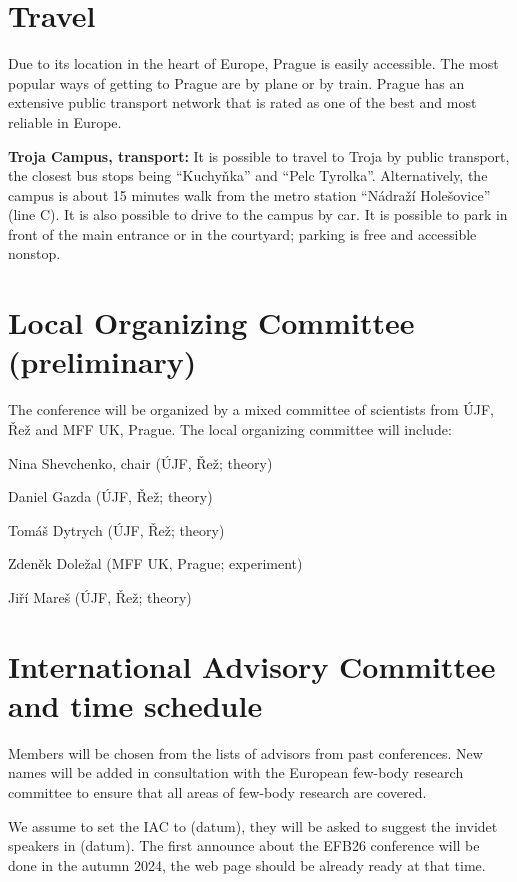 \documentclass[12pt]{extarticle}
\newcommand*\sq{\mathbin{\vcenter{\hbox{\rule{.8ex}{.8ex}}}}}
\newenvironment{t_sq_itemize}
{\begin{itemize}[topsep=0pt, parsep=0pt, itemsep=0pt, leftmargin=*]
    \renewcommand{\labelitemi}{{\(\sq\)}}}
  {\end{itemize}}
\begin{document}
\section*{Travel}
\noindent
%
Due to its location in the heart of Europe, Prague is easily
accessible. The most popular ways of getting to Prague are by plane or
by train. Prague has an extensive public transport network that is
rated as one of the best and most reliable in Europe.

{\bf Troja Campus, transport:} It is possible to travel to Troja by public transport, the closest bus stops being “Kuchyňka”
and “Pelc Tyrolka”. Alternatively, the campus is about 15 minutes walk from the metro station “Nádraží Holešovice”
(line C). It is also possible to drive to the campus by car. It is possible to park in front of the main entrance or in the courtyard;
parking is free and accessible nonstop.


\section*{Local Organizing Committee (preliminary)}
\noindent
The conference will be organized by a mixed committee of scientists from ÚJF, Řež and MFF UK, Prague.
The local organizing committee will include:
\begin{t_sq_itemize}
\item Nina Shevchenko, chair (ÚJF, Řež; theory)
\item Daniel Gazda (ÚJF, Řež; theory)
\item Tomáš Dytrych (ÚJF, Řež; theory)
\item Zdeněk Doležal (MFF UK, Prague; experiment)
\item Jiří Mareš (ÚJF, Řež; theory) 
\end{t_sq_itemize}

\section*{International Advisory Committee and time schedule}
\noindent
%
Members will be chosen from the lists of advisors from past conferences. New names
will be added in consultation with the European few-body research committee to ensure that all
areas of few-body research are covered. 

We assume to set the IAC to (datum), they will be asked to suggest the invidet speakers in (datum). 
The first announce about the EFB26 conference will be done in the autumn 2024, the web page
should be already ready at that time.
\end{document}

